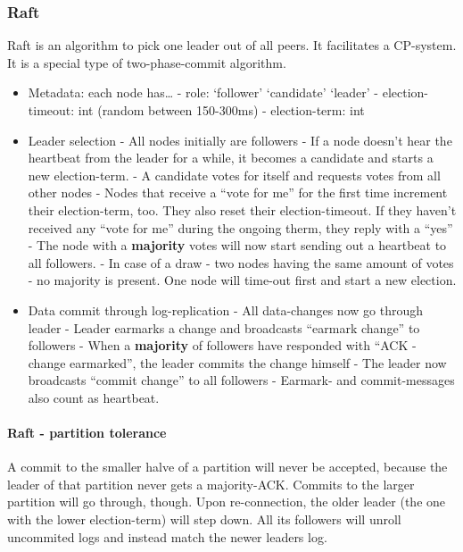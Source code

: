 \hypertarget{raft}{%
\subsubsection{Raft}\label{raft}}

Raft is an algorithm to pick one leader out of all peers. It facilitates
a CP-system. It is a special type of two-phase-commit algorithm.

\begin{itemize}
 
\item
  Metadata: each node has\ldots{} - role: `follower' \textbar{}
  `candidate' \textbar{} `leader' - election-timeout: int (random
  between 150-300ms) - election-term: int
\item
  Leader selection - All nodes initially are followers - If a node
  doesn't hear the heartbeat from the leader for a while, it becomes a
  candidate and starts a new election-term. - A candidate votes for
  itself and requests votes from all other nodes - Nodes that receive a
  ``vote for me'' for the first time increment their election-term, too.
  They also reset their election-timeout. If they haven't received any
  ``vote for me'' during the ongoing therm, they reply with a ``yes'' -
  The node with a \textbf{majority} votes will now start sending out a
  heartbeat to all followers. - In case of a draw - two nodes having the
  same amount of votes - no majority is present. One node will time-out
  first and start a new election.
\item
  Data commit through log-replication - All data-changes now go through
  leader - Leader earmarks a change and broadcasts ``earmark change'' to
  followers - When a \textbf{majority} of followers have responded with
  ``ACK - change earmarked'', the leader commits the change himself -
  The leader now broadcasts ``commit change'' to all followers -
  Earmark- and commit-messages also count as heartbeat.
\end{itemize}

\hypertarget{raft---partition-tolerance}{%
\paragraph{Raft - partition
tolerance}\label{raft---partition-tolerance}}

A commit to the smaller halve of a partition will never be accepted,
because the leader of that partition never gets a majority-ACK. Commits
to the larger partition will go through, though. Upon re-connection, the
older leader (the one with the lower election-term) will step down. All
its followers will unroll uncommited logs and instead match the newer
leaders log.

